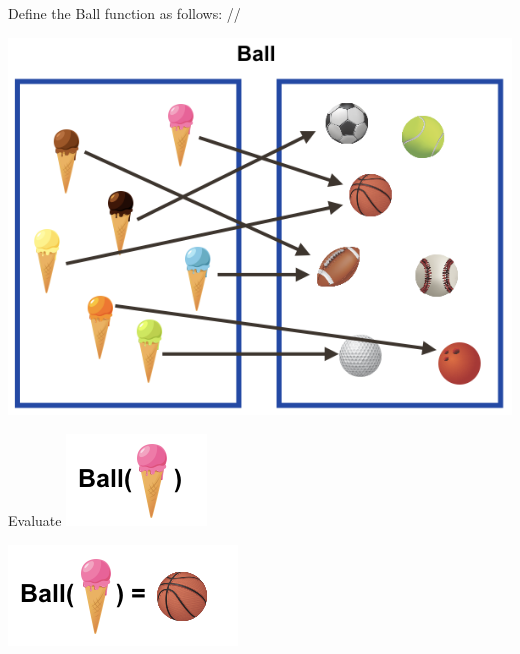\documentclass{ximera}
\begin{document}
Define the Ball function as follows: //
\begin{image}
\includegraphics{pics/func_ball.png}
\end{image}

\begin{question}
Evaluate \includegraphics{pics/Q_1.png}
\begin{multipleChoice}
\end{multipleChoice}
\begin{feedback}
\includegraphics{pics/A_1.png}
\end{feedback}
\end{question}
\end{document}
